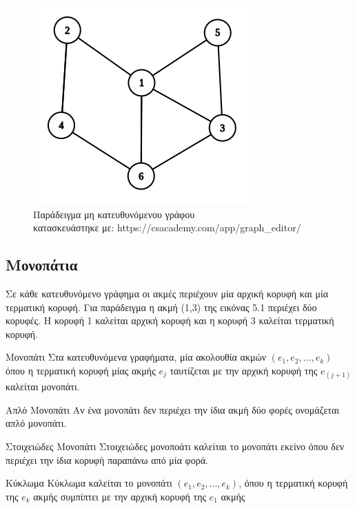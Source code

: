 \documentclass[oneside,12pt]{book}
\newenvironment{matlab}
	{\begin{figure}[hp]\centering\captionsetup{justification=centering}}
	{\end{figure}}
\theoremstyle{definition}
\begin{document}
\begin{matlab}
	\includegraphics[scale=0.8]{images/undirected_graph_example.png}
	\caption{Παράδειγμα μη κατευθυνόμενου γράφου \\ κατασκευάστηκε με: https://csacademy.com/app/graph\_editor/}
\end{matlab}   

\subsection{Μονοπάτια}

Σε κάθε κατευθυνόμενο γράφημα οι ακμές περιέχουν μία αρχική κορυφή και μία τερματική κορυφή. Για παράδειγμα η ακμή (1,3) της εικόνας 5.1 περιέχει δύο κορυφές. Η κορυφή 1 καλείται αρχική κορυφή και η κορυφή 3 καλείται τερματική κορυφή. \\

\begin{mydefinition}{Μονοπάτι}{}
	Στα κατευθυνόμενα γραφήματα, μία ακολουθία ακμών \((e_1, e_2,...,e_k)\) όπου η τερματική κορυφή μίας ακμής \(e_j\) ταυτίζεται με την αρχική κορυφή της \(e_{(j+1)}\) καλείται μονοπάτι.
\end{mydefinition}

\begin{mydefinition}{Απλό Μονοπάτι}{}
	Αν ένα μονοπάτι δεν περιέχει την ίδια ακμή δύο φορές ονομάζεται απλό μονοπάτι.
\end{mydefinition}

\begin{mydefinition}{Στοιχειώδες Μονοπάτι}{}
	Στοιχειώδες μονοποάτι καλείται το μονοπάτι εκείνο όπου δεν περιέχει την ίδια κορυφή παραπάνω από μία φορά.
\end{mydefinition}

\begin{mydefinition}{Κύκλωμα}{}
	Κύκλωμα καλείται το μονοπάτι \((e_1, e_2,...,e_k)\), όπου η τερματική κορυφή της \(e_k\) ακμής συμπίπτει με την αρχική κορυφή της \(e_1\) ακμής
\end{mydefinition}
\end{document}
